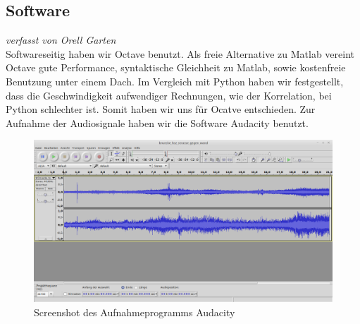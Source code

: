 \subsection{Software}
\small\textit{verfasst von Orell Garten\\}
\normalsize
Softwareseitig haben wir Octave benutzt. Als freie Alternative zu Matlab vereint Octave gute Performance, syntaktische Gleichheit zu Matlab, sowie kostenfreie Benutzung unter einem Dach. Im Vergleich mit Python haben wir festgestellt, dass die Geschwindigkeit aufwendiger Rechnungen, wie der Korrelation, bei Python schlechter ist. Somit haben wir uns für Ocatve entschieden. Zur Aufnahme der Audiosignale haben wir die Software Audacity benutzt.
\begin{figure}[ht!]
  \centering
  \includegraphics[width=\textwidth]{img/audacity}
  \caption{Screenshot des Aufnahmeprogramms Audacity}
  \label{audacity}
\end{figure}
